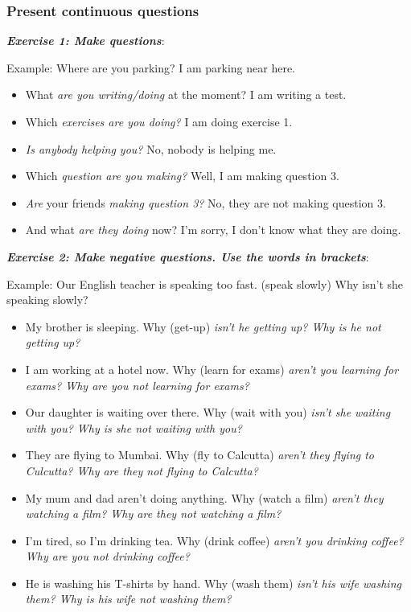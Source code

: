 \subsubsection{Present continuous questions}

\textbf{\textit{Exercise 1: Make questions}}:

Example: Where are you parking? I am parking near here.

\begin{itemize}

\item What \textit{are you writing/doing} at the moment? I am writing a test.
\item Which \textit{exercises are you doing?} I am doing exercise 1.
\item \textit{Is anybody helping you?} No, nobody is helping me.
\item Which \textit{question are you making?} Well, I am making question 3.
\item \textit{Are} your friends \textit{making question 3?} No, they are not making question 3.
\item And what \textit{are they doing} now? I'm sorry, I don't know what they are doing.

\end{itemize}

\textbf{\textit{Exercise 2: Make negative questions. Use the words in brackets}}:

Example:
Our English teacher is speaking too fast. (speak slowly) Why isn't she speaking slowly?

\begin{itemize}

\item My brother is sleeping. Why (get-up) \textit{isn't he getting up? Why is he not getting up?}
\item I am working at a hotel now. Why (learn for exams) \textit{aren't you learning for exams? Why are you not learning for exams?}
\item Our daughter is waiting over there. Why (wait with you) \textit{isn't she waiting with you? Why is she not waiting with you?}
\item They are flying to Mumbai. Why (fly to Calcutta) \textit{aren't they flying to Culcutta? Why are they not flying to Calcutta?}
\item My mum and dad aren't doing anything. Why (watch a film) \textit{aren't they watching a film? Why are they not watching a film?}
\item I'm tired, so I'm drinking tea. Why (drink coffee) \textit{aren't you drinking coffee? Why are you not drinking coffee?}
\item He is washing his T-shirts by hand. Why (wash them) \textit{isn't his wife washing them? Why is his wife not washing them?}

\end{itemize}

